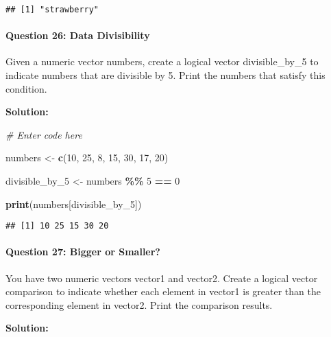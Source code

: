 \documentclass[
]{article}
\newenvironment{Shaded}{\begin{snugshade}}{\end{snugshade}}
\newcommand{\CommentTok}[1]{\textcolor[rgb]{0.56,0.35,0.01}{\textit{#1}}}
\newcommand{\DecValTok}[1]{\textcolor[rgb]{0.00,0.00,0.81}{#1}}
\newcommand{\FunctionTok}[1]{\textcolor[rgb]{0.13,0.29,0.53}{\textbf{#1}}}
\newcommand{\NormalTok}[1]{#1}
\newcommand{\OtherTok}[1]{\textcolor[rgb]{0.56,0.35,0.01}{#1}}
\newcommand{\SpecialCharTok}[1]{\textcolor[rgb]{0.81,0.36,0.00}{\textbf{#1}}}
\begin{document}
\begin{verbatim}
## [1] "strawberry"
\end{verbatim}

\hypertarget{question-26-data-divisibility}{%
\paragraph{Question 26: Data
Divisibility}\label{question-26-data-divisibility}}

Given a numeric vector numbers, create a logical vector divisible\_by\_5
to indicate numbers that are divisible by 5. Print the numbers that
satisfy this condition.

\textbf{Solution:}

\begin{Shaded}
\begin{Highlighting}[]
\CommentTok{\# Enter code here}

\NormalTok{numbers }\OtherTok{\textless{}{-}} \FunctionTok{c}\NormalTok{(}\DecValTok{10}\NormalTok{, }\DecValTok{25}\NormalTok{, }\DecValTok{8}\NormalTok{, }\DecValTok{15}\NormalTok{, }\DecValTok{30}\NormalTok{, }\DecValTok{17}\NormalTok{, }\DecValTok{20}\NormalTok{)}

\NormalTok{divisible\_by\_5 }\OtherTok{\textless{}{-}}\NormalTok{ numbers }\SpecialCharTok{\%\%} \DecValTok{5} \SpecialCharTok{==} \DecValTok{0}

\FunctionTok{print}\NormalTok{(numbers[divisible\_by\_5])}
\end{Highlighting}
\end{Shaded}

\begin{verbatim}
## [1] 10 25 15 30 20
\end{verbatim}

\hypertarget{question-27-bigger-or-smaller}{%
\paragraph{Question 27: Bigger or
Smaller?}\label{question-27-bigger-or-smaller}}

You have two numeric vectors vector1 and vector2. Create a logical
vector comparison to indicate whether each element in vector1 is greater
than the corresponding element in vector2. Print the comparison results.

\textbf{Solution:}
\end{document}
